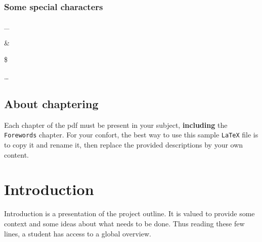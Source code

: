 \documentclass{42-en}
\begin{document}
        \newpage


        \subsection{Some special characters}

            \begin{description}\itemsep1pt
                \item [Underscore :] \_
                \item [Ampersand :] \&
                \item [Dollar :] \$
                \item [Elipsis :] \dots
            \end{description}


    \section{About chaptering}

    Each chapter of the pdf must be present in your subject,
    \textbf{including} the \texttt{Forewords} chapter. For your
    confort, the best way to use this sample \texttt{LaTeX} file is to
    copy it and rename it, then replace the provided descriptions by
    your own content.\\


\chapter{Introduction}

    Introduction is a presentation of the project outline. It is valued
    to provide some context and some ideas about what needs to be done.
    Thus reading these few lines, a student has access to a global overview.
\end{document}
